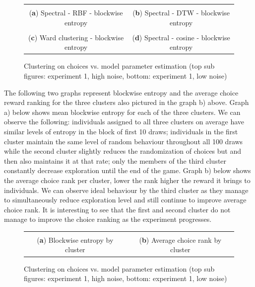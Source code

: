 \documentclass[12pt,a4paper,bibliography=totocnumbered,listof=totocnumbered]{scrartcl}
\begin{document}
\begin{figure}[H]
	\centering
	\small
	\hspace*{-0.7in}
	\begin{tabular}{cc}
		 &  \\
		(\textbf{a}) Spectral - RBF - blockwise entropy & (\textbf{b}) Spectral - DTW - blockwise entropy \\
			 &  \\
			(\textbf{c}) Ward clustering - blockwise entropy & (\textbf{d}) Spectral - cosine - blockwise entropy
	\end{tabular} \quad
	\caption{Clustering on choices vs. model parameter estimation (top sub figures: experiment 1, high noise, bottom: experiment 1, low noise)}
	\label{fig:cluse1c2}
\end{figure}

The following two graphs represent  blockwise entropy and the average choice reward ranking for the three clusters also pictured in the graph b) above. Graph a) below shows mean blockwise entropy for each of the three clusters. We can observe the following: individuals assigned to all three clusters on average have similar levels of entropy in the block of first 10 draws; individuals in the first cluster maintain the same level of random behaviour throughout all 100 draws while the second cluster slightly reduces the randomization of choices but and then also maintains it at that rate; only the members of the third cluster constantly decrease exploration until the end of the game. Graph b) below shows the average choice rank per cluster, lower the rank higher the reward it brings to individuals. We can observe ideal behaviour by the third cluster as they manage to simultaneously reduce  exploration level and still continue to improve average choice rank. It is interesting to see that the first and second cluster do not manage to improve the choice ranking as the experiment progresses. 

\begin{figure}[H]
	\centering
	\small
	\hspace*{-0.7in}
	\begin{tabular}{cc}
		 &  \\
		(\textbf{a}) Blockwise entropy by cluster & (\textbf{b}) Average choice rank by cluster 
	\end{tabular} \quad
	\caption{Clustering on choices vs. model parameter estimation (top sub figures: experiment 1, high noise, bottom: experiment 1, low noise)}
	\label{fig:cluse1c4}
\end{figure}
\end{document}
